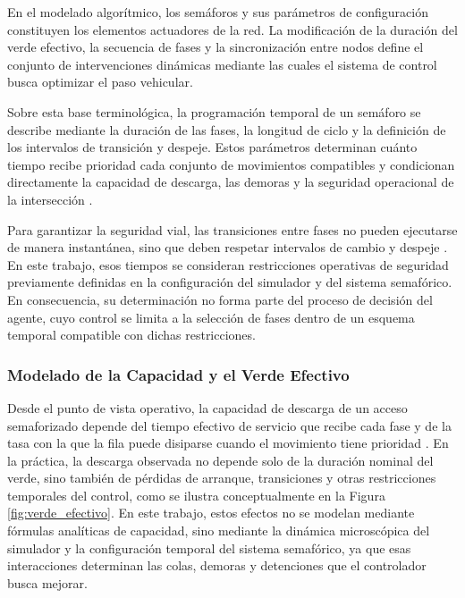 En el modelado algorítmico, los semáforos y sus parámetros de configuración constituyen los elementos actuadores de la red. La modificación de la duración del verde efectivo, la secuencia de fases y la sincronización entre nodos define el conjunto de intervenciones dinámicas mediante las cuales el sistema de control busca optimizar el paso vehicular.

Sobre esta base terminológica, la programación temporal de un semáforo se describe mediante la duración de las fases, la longitud de ciclo y la definición de los intervalos de transición y despeje. Estos parámetros determinan cuánto tiempo recibe prioridad cada conjunto de movimientos compatibles y condicionan directamente la capacidad de descarga, las demoras y la seguridad operacional de la intersección \cite[pp.~341--343]{ite_handbook}.

Para garantizar la seguridad vial, las transiciones entre fases no pueden ejecutarse de manera instantánea, sino que deben respetar intervalos de cambio y despeje \cite[pp.~348--349]{ite_handbook}. En este trabajo, esos tiempos se consideran restricciones operativas de seguridad previamente definidas en la configuración del simulador y del sistema semafórico. En consecuencia, su determinación no forma parte del proceso de decisión del agente, cuyo control se limita a la selección de fases dentro de un esquema temporal compatible con dichas restricciones.

\subsubsection{Modelado de la Capacidad y el Verde Efectivo}

Desde el punto de vista operativo, la capacidad de descarga de un acceso semaforizado depende del tiempo efectivo de servicio que recibe cada fase y de la tasa con la que la fila puede disiparse cuando el movimiento tiene prioridad \cite[pp.~59--60]{fernandez}. En la práctica, la descarga observada no depende solo de la duración nominal del verde, sino también de pérdidas de arranque, transiciones y otras restricciones temporales del control, como se ilustra conceptualmente en la Figura \ref{fig:verde_efectivo}. En este trabajo, estos efectos no se modelan mediante fórmulas analíticas de capacidad, sino mediante la dinámica microscópica del simulador y la configuración temporal del sistema semafórico, ya que esas interacciones determinan las colas, demoras y detenciones que el controlador busca mejorar.

